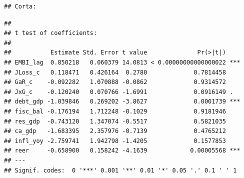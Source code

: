 \documentclass[
]{article}
\newenvironment{Shaded}{\begin{snugshade}}{\end{snugshade}}
\newcommand{\AttributeTok}[1]{\textcolor[rgb]{0.13,0.29,0.53}{#1}}
\newcommand{\ConstantTok}[1]{\textcolor[rgb]{0.56,0.35,0.01}{#1}}
\newcommand{\ControlFlowTok}[1]{\textcolor[rgb]{0.13,0.29,0.53}{\textbf{#1}}}
\newcommand{\DecValTok}[1]{\textcolor[rgb]{0.00,0.00,0.81}{#1}}
\newcommand{\FunctionTok}[1]{\textcolor[rgb]{0.13,0.29,0.53}{\textbf{#1}}}
\newcommand{\NormalTok}[1]{#1}
\newcommand{\OtherTok}[1]{\textcolor[rgb]{0.56,0.35,0.01}{#1}}
\newcommand{\SpecialCharTok}[1]{\textcolor[rgb]{0.81,0.36,0.00}{\textbf{#1}}}
\newcommand{\StringTok}[1]{\textcolor[rgb]{0.31,0.60,0.02}{#1}}
\begin{document}
\begin{Shaded}
\end{Shaded}

\begin{verbatim}
## Corta:
\end{verbatim}

\begin{verbatim}
## 
## t test of coefficients:
## 
##           Estimate Std. Error t value              Pr(>|t|)    
## EMBI_lag  0.850218   0.060379 14.0813 < 0.00000000000000022 ***
## JLoss_c   0.118471   0.426164  0.2780             0.7814458    
## GaR_c    -0.092282   1.070888 -0.0862             0.9314572    
## JxG_c    -0.120240   0.070766 -1.6991             0.0916149 .  
## debt_gdp -1.039846   0.269202 -3.8627             0.0001739 ***
## fisc_bal -0.176194   1.712248 -0.1029             0.9181946    
## res_gdp  -0.743120   1.347074 -0.5517             0.5821035    
## ca_gdp   -1.683395   2.357976 -0.7139             0.4765212    
## infl_yoy -2.759741   1.942798 -1.4205             0.1577853    
## reer     -0.658900   0.158242 -4.1639            0.00005568 ***
## ---
## Signif. codes:  0 '***' 0.001 '**' 0.01 '*' 0.05 '.' 0.1 ' ' 1
\end{verbatim}
\end{document}
